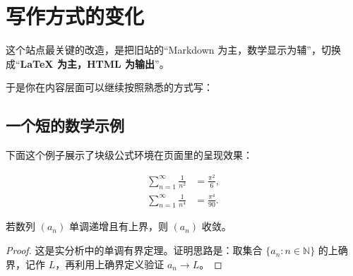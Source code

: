 
\section{写作方式的变化}

这个站点最关键的改造，是把旧站的“Markdown 为主，数学显示为辅”，切换成“\textbf{LaTeX 为主，HTML 为输出}”。

于是你在内容层面可以继续按照熟悉的方式写：


\subsection{一个短的数学示例}

下面这个例子展示了块级公式环境在页面里的呈现效果：

\begin{align}
\sum_{n=1}^{\infty}\frac{1}{n^2}
&=
\frac{\pi^2}{6}, \\
\sum_{n=1}^{\infty}\frac{1}{n^4}
&=
\frac{\pi^4}{90}.
\end{align}

\begin{theorem}[一个非常基础的结论]
若数列 $(a_n)$ 单调递增且有上界，则 $(a_n)$ 收敛。
\end{theorem}

\begin{proof}
这是实分析中的单调有界定理。证明思路是：取集合 $\{a_n : n \in \mathbb{N}\}$ 的上确界，记作 $L$，再利用上确界定义验证 $a_n \to L$。
\end{proof}

